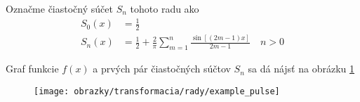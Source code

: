 \begin{priklad}
    Označme čiastočný súčet $S_n$ tohoto radu ako 
    \begin{equation}
    \begin{split}
        S_0(x) &= \frac{1}{2} \\
        S_n(x) &= \frac{1}{2} + \frac{2}{\pi} \sum_{m=1}^{n}
                \frac{\sin\left[ (2m-1) x\right]}{2m-1} \quad n>0
    \end{split}
    \end{equation}
    
    Graf funkcie $f(x)$ a prvých pár čiastočných súčtov $S_n$ sa dá
    nájsť na obrázku \ref{fig:example_pulse}

    \begin{figure}[htp]
        \centering
        \texttt{[image: obrazky/transformacia/rady/example\_pulse]}
        \caption{}
        \label{fig:example_pulse}
    \end{figure}    
\end{priklad}

